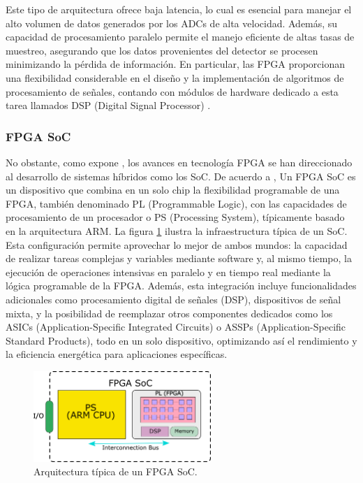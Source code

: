 \documentclass[]{book}
\begin{document}
\noindent Este tipo de arquitectura ofrece baja latencia, lo cual es esencial para manejar el alto volumen de datos generados por los ADCs de alta velocidad. Además, su capacidad de procesamiento paralelo permite el manejo eficiente de altas tasas de muestreo, asegurando que los datos provenientes del detector se procesen minimizando la pérdida de información. En particular, las FPGA proporcionan una flexibilidad considerable en el diseño y la implementación de algoritmos de procesamiento de señales, contando con módulos de hardware dedicado a esta tarea llamados DSP (Digital Signal Processor) \cite{meyer2007digital}.\\

\subsubsection{FPGA SoC}

\noindent No obstante, como expone \cite{bravo2020new}, los avances en tecnología FPGA se han direccionado al desarrollo de sistemas híbridos como los SoC. De acuerdo a \cite{amd_zynq_7000}, Un FPGA SoC es un dispositivo que combina en un solo chip la flexibilidad programable de una FPGA, también denominado PL (Programmable Logic), con las capacidades de procesamiento de un procesador o PS (Processing System), típicamente basado en la arquitectura ARM. La figura \ref{fig:fpga_soc} ilustra la infraestructura típica de un SoC. \\ 

\noindent Esta configuración permite aprovechar lo mejor de ambos mundos: la capacidad de realizar tareas complejas y variables mediante software y, al mismo tiempo, la ejecución de operaciones intensivas en paralelo y en tiempo real mediante la lógica programable de la FPGA. Además, esta integración incluye funcionalidades adicionales como procesamiento digital de señales (DSP), dispositivos de señal mixta, y la posibilidad de reemplazar otros componentes dedicados como los ASICs (Application-Specific Integrated Circuits) o ASSPs (Application-Specific Standard Products), todo en un solo dispositivo, optimizando así el rendimiento y la eficiencia energética para aplicaciones específicas.\\

\begin{figure}[h]
    \centering
    \includegraphics[width=0.6\textwidth]{FPGA_SoC.png}
    \caption{Arquitectura típica de un FPGA SoC.}
    \label{fig:fpga_soc}

\end{figure}
\end{document}
